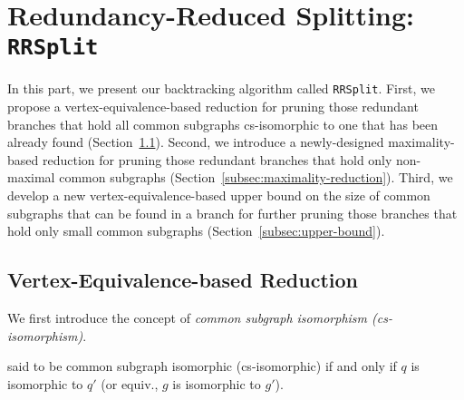 
\section{Redundancy-Reduced Splitting: \texttt{RRSplit}}
\label{sec:RRSplit}


In this part, we present our backtracking algorithm called \texttt{RRSplit}. 
%
First, we propose a vertex-equivalence-based reduction for pruning those redundant branches that hold all common subgraphs cs-isomorphic to {\chengC one that has been already found} (Section~\ref{subsec:VE-reduction}).
%
Second, we introduce a newly-designed maximality-based reduction for pruning those redundant branches that hold only non-maximal common subgraphs (Section~\ref{subsec:maximality-reduction}). 
%
{\YuiR Third, we develop a new vertex-equivalence-based upper bound on the size of common subgraphs that can be found in a branch for further pruning those branches that hold only small common subgraphs (Section~\ref{subsec:upper-bound}).}
%



\subsection{Vertex-Equivalence-based Reduction}
\label{subsec:VE-reduction}
We first introduce the concept of \emph{common subgraph isomorphism (cs-isomorphism)}.
\begin{definition}  
     said to be common subgraph isomorphic (cs-isomorphic)  if and only if $q$ is {\chengC isomorphic} to $q'$ (or equiv., $g$ is {\chengC isomorphic} to $g'$).
\end{definition}


